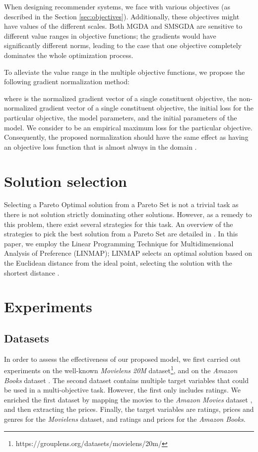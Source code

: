 \documentclass[letterpaper]{article}
\begin{document}
When designing recommender systems, we face with various objectives (as described in the Section \ref{sec:objectives}). Additionally, these objectives might have values of the different scales. Both MGDA and SMSGDA are sensitive to different value ranges in objective functions; the gradients would have significantly different norms, leading to the case that one objective completely dominates the whole optimization process.

To alleviate the value range in the multiple objective functions, we propose the following gradient normalization method:

where  is the normalized gradient vector of a single constituent objective,  the non-normalized gradient vector of a single constituent objective,  the initial loss for the particular objective,  the model parameters, and  the initial parameters of the model. We consider  to be an empirical maximum loss for the particular objective. Consequently, the proposed normalization should have the same effect as having an objective loss function that is almost always in the domain .



\section{Solution selection}

Selecting a Pareto Optimal solution from a Pareto Set is not a trivial task as there is not solution strictly dominating other solutions. However, as a remedy to this problem, there exist several strategies for this task. An overview of the strategies to pick the best solution from a Pareto Set are detailed in \cite{doi:10.1021/acs.iecr.6b03453}. In this paper, we employ the Linear Programming Technique for Multidimensional Analysis of Preference (LINMAP); LINMAP selects an optimal solution based on the Euclidean distance from the ideal point, selecting the solution with the shortest distance \cite{Srinivasan1973}.



\section{Experiments}

\subsection{Datasets}

In order to assess the effectiveness of our proposed model, we first carried out experiments on the well-known \textit{Movielens 20M} dataset\footnote{https://grouplens.org/datasets/movielens/20m/}, and on the \textit{Amazon Books} dataset \cite{mcauley2013hidden}. The second dataset contains multiple target variables that could be used in a multi-objective task. However, the first only includes ratings. We enriched the first dataset by mapping the movies to the \textit{Amazon Movies} dataset \cite{mcauley2013hidden}, and then extracting the prices. Finally, the target variables are ratings, prices and genres for the \textit{Movielens} dataset, and ratings and prices for the \textit{Amazon Books}.
\end{document}
